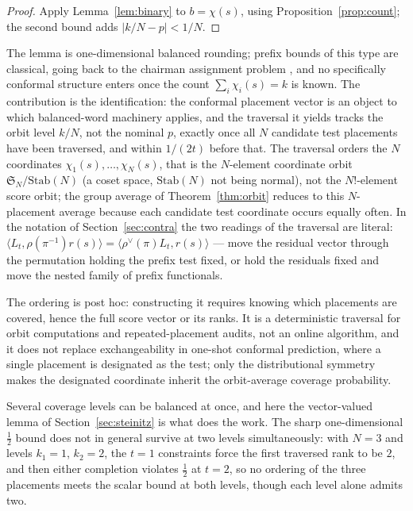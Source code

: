 \documentclass[11pt]{article}
\theoremstyle{remark}
\begin{document}
\begin{proof}
Apply Lemma~\ref{lem:binary} to $b=\chi(s)$, using Proposition~\ref{prop:count}; the second
bound adds $|k/N-p|<1/N$.
\end{proof}

The lemma is one-dimensional balanced rounding; prefix bounds of this type are classical, going
back to the chairman assignment problem \citep{tijdeman1980}, and no specifically conformal
structure enters once the count $\sum_i\chi_i(s)=k$ is known. The contribution is the
identification: the conformal placement vector is an object to which balanced-word machinery
applies, and the traversal it yields tracks the orbit level $k/N$, not the nominal $p$, exactly
once all $N$ candidate test placements have been traversed, and within $1/(2t)$ before that.
The traversal orders the $N$ coordinates $\chi_1(s),\dots,\chi_N(s)$, that is the $N$-element
coordinate orbit $\mathfrak S_N/\mathrm{Stab}(N)$ (a coset space, $\mathrm{Stab}(N)$ not being normal), not the $N!$-element score orbit; the
group average of Theorem~\ref{thm:orbit} reduces to this $N$-placement average because each
candidate test coordinate occurs equally often. In the notation of Section~\ref{sec:contra}
the two readings of the traversal are literal:
$\langle L_t,\rho(\pi^{-1})r(s)\rangle=\langle\rho^{\vee}(\pi)L_t,r(s)\rangle$ --- move the
residual vector through the permutation holding the prefix test fixed, or hold the residuals
fixed and move the nested family of prefix functionals.

The ordering is post hoc: constructing it requires knowing which placements are covered, hence
the full score vector or its ranks. It is a deterministic traversal for orbit computations and
repeated-placement audits, not an online algorithm, and it does not replace exchangeability in
one-shot conformal prediction, where a single placement is designated as the test; only the
distributional symmetry makes the designated coordinate inherit the orbit-average coverage
probability.

Several coverage levels can be balanced at once, and here the vector-valued lemma of
Section~\ref{sec:steinitz} is what does the work. The sharp one-dimensional $\tfrac12$ bound
does not in general survive at two levels simultaneously: with $N=3$ and levels $k_1=1$,
$k_2=2$, the $t=1$ constraints force the first traversed rank to be $2$, and then either
completion violates $\tfrac12$ at $t=2$, so no ordering of the three placements meets the
scalar bound at both levels, though each level alone admits two.
\end{document}
